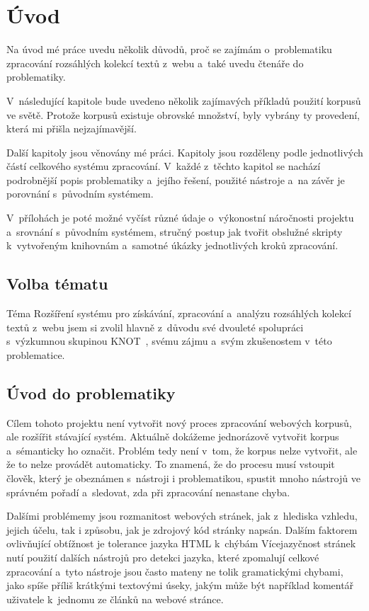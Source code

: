 
\chapter{Úvod}
Na úvod mé práce uvedu několik důvodů, proč se zajímám o~problematiku zpracování
rozsáhlých kolekcí textů z~webu a~také uvedu čtenáře do problematiky.

V~následující kapitole bude uvedeno několik zajímavých příkladů použití korpusů ve světě.
Protože korpusů existuje obrovské množství, byly vybrány ty provedení, která mi přišla
nejzajímavější.

Další kapitoly jsou věnovány mé práci. Kapitoly jsou rozděleny podle jednotlivých částí celkového
systému zpracování. V~každé z~těchto kapitol se nachází podrobnější popis
problematiky a~jejího řešení, použité nástroje a~na závěr je porovnání
s~původním systémem.

V~přílohách je poté možné vyčíst různé údaje o~výkonostní náročnosti projektu a~srovnání s~původním systémem,
stručný postup jak tvořit obslužné skripty k~vytvořeným knihovnám a~samotné úkázky jednotlivých kroků zpracování.

\section{Volba tématu}
Téma Rozšíření systému pro získávání, zpracování a~analýzu rozsáhlých kolekcí textů z~webu
jsem si zvolil hlavně z~důvodu své dvouleté spolupráci s~výzkumnou skupinou KNOT~\cite{KNOT}, svému zájmu a~svým zkušenostem v~této problematice.

\section{Úvod do problematiky}
Cílem tohoto projektu není vytvořit nový proces zpracování webových korpusů, ale rozšířit stávající
systém. Aktuálně dokážeme jednorázově vytvořit korpus a~sémanticky ho označit. Problém tedy není v~tom,
že korpus nelze vytvořit, ale že to nelze provádět automaticky. To znamená, že do procesu musí vstoupit
člověk, který je obeznámen s~nástroji i problematikou, spustit mnoho nástrojů ve správném pořadí a~sledovat, zda při zpracování nenastane chyba.

Dalšími problémemy jsou rozmanitost webových stránek, jak z~hlediska vzhledu, jejich účelu, tak i
způsobu, jak je zdrojový kód stránky napsán. Dalším faktorem ovlivňující obtížnost je tolerance jazyka HTML k~chýbám
Vícejazyčnost stránek nutí použití dalších nástrojů pro detekci jazyka, které zpomalují celkové zpracování
a~tyto nástroje jsou často mateny ne tolik gramatickými chybami, jako spíše příliš krátkými textovými úseky,
jakým může být například komentář uživatele k~jednomu ze článků na webové stránce.

